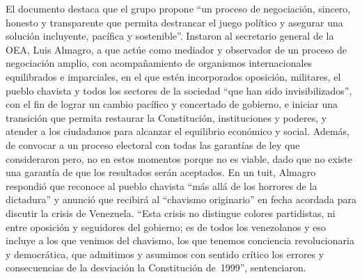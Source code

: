 \documentclass{article}%
\begin{document}
\newline%
%
El documento destaca que el grupo propone “un proceso de negociación, sincero, honesto y transparente que permita destrancar el juego político y asegurar una solución incluyente, pacífica y sostenible”.%
\newline%
%
Instaron al secretario general de la OEA, Luis Almagro, a que actúe como mediador y observador de un proceso de negociación amplio, con acompañamiento de organismos internacionales equilibrados e imparciales, en el que estén incorporados oposición, militares, el pueblo chavista y todos los sectores de la sociedad “que han sido invisibilizados”, con el fin de lograr un cambio pacífico y concertado de gobierno, e iniciar una transición que permita restaurar la Constitución, instituciones y poderes, y atender a los ciudadanos para alcanzar el equilibrio económico y social.%
\newline%
%
Además, de convocar a un proceso electoral con todas las garantías de ley que consideraron pero, no en estos momentos porque no es viable, dado que no existe una garantía de que los resultados serán aceptados.%
\newline%
%
En un tuit, Almagro respondió que reconoce al pueblo chavista “más allá de los horrores de la dictadura” y anunció que recibirá al “chavismo originario” en fecha acordada para discutir la crisis de Venezuela.%
\newline%
%
“Esta crisis no distingue colores partidistas, ni entre oposición y seguidores del gobierno; es de todos los venezolanos y eso incluye a los que venimos del chavismo, los que tenemos conciencia revolucionaria y democrática, que admitimos y asumimos con sentido crítico los errores y consecuencias de la desviación la Constitución de~1999”, sentenciaron.%
\newline%
%
\end{document}
